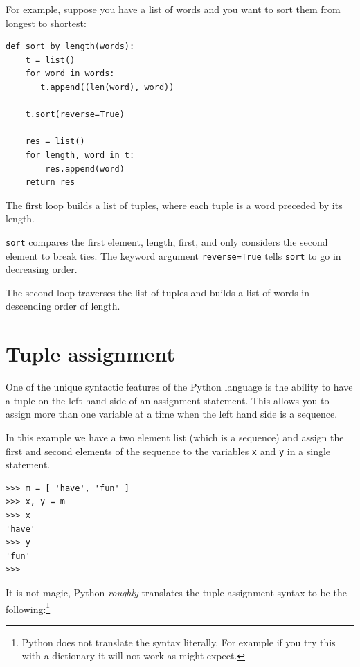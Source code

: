 \documentclass[10pt]{book}
\begin{document}
\label{DSU}

For example, suppose you have a list of words and you want to
sort them from longest to shortest:

\beforeverb
\begin{verbatim}
def sort_by_length(words):
    t = list()
    for word in words:
       t.append((len(word), word))

    t.sort(reverse=True)

    res = list()
    for length, word in t:
        res.append(word)
    return res
\end{verbatim}
\afterverb
%
The first loop builds a list of tuples, where each
tuple is a word preceded by its length.

{\tt sort} compares the first element, length, first, and
only considers the second element to break ties.  The keyword argument
{\tt reverse=True} tells {\tt sort} to go in decreasing order.


The second loop traverses the list of tuples and builds a list of
words in descending order of length.


\section{Tuple assignment}
\label{tuple assignment}


One of the unique syntactic features of the Python language
is the ability to have a tuple on the left hand
side of an assignment statement.  This allows you to assign
more than one variable at a time when the left hand side is a 
sequence.

In this example we have a two element list (which is a sequence) and
assign the first and second elements of the sequence
to the variables {\tt x} and {\tt y} in a single statement.

\beforeverb
\begin{verbatim}
>>> m = [ 'have', 'fun' ]
>>> x, y = m
>>> x
'have'
>>> y
'fun'
>>> 
\end{verbatim}
\afterverb
%
It is not magic, Python {\em roughly} translates the 
tuple assignment syntax
to be the following:\footnote{Python does not translate the 
syntax literally.  For example if you try this with a dictionary
it will not work as might expect.}
\end{document}
